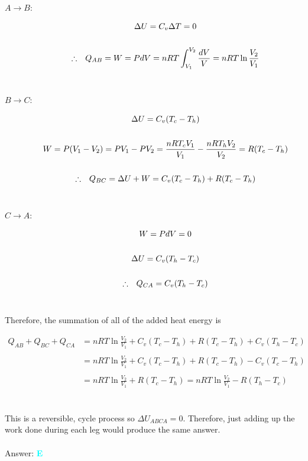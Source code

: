 \documentclass{article}
\begin{document}
\begin{description}
\item[$A \rightarrow B$:] 
\begin{gather}
\Delta U = C_{v} \Delta T = 0\nonumber\\
\nonumber\\
\therefore \hspace{.1in} Q_{AB} = W = PdV =  nRT \int_{V_{1}}^{V_{2}} {\frac{d V}{V}} =  nRT \ln{\frac{V_{2}}{V_{1}}}\nonumber
\end{gather}
\\
\item[$B \rightarrow C$:] 
\begin{gather}
\Delta U = C_{v} (T_{c} - T_{h})\nonumber\\
\nonumber\\
W = P (V_{1} - V_{2}) = P V_{1} - P V_{2} = \frac{nRT_{c} V_{1}}{V_{1}} - \frac{nRT_{h} V_{2}}{V_{2}} = R (T_{c} - T_{h})\nonumber\\
\nonumber\\
\therefore \hspace{.1in} Q_{BC} = \Delta U + W = C_{v} (T_{c} - T_{h}) + R (T_{c} - T_{h})\nonumber
\end{gather}
\\
\item[$C \rightarrow A$:] 
\begin{gather}
W = PdV = 0\nonumber\\
\nonumber\\
\Delta U = C_{v} (T_{h} - T_{c})\nonumber\\
\nonumber\\
\therefore \hspace{.1in} Q_{CA} =  C_{v} (T_{h} - T_{c})\nonumber
\end{gather}
\\
\end{description}
Therefore, the summation of all of the added heat energy is

\begin{align}
Q_{AB} + Q_{BC} + Q_{CA} &= nRT \ln{\frac{V_{2}}{V_{1}}} + C_{v} (T_{c} - T_{h}) + R (T_{c} - T_{h}) + C_{v} (T_{h} - T_{c})\nonumber\\
\nonumber\\
&= nRT \ln{\frac{V_{2}}{V_{1}}} + C_{v} (T_{c} - T_{h}) + R (T_{c} - T_{h}) - C_{v} (T_{c} - T_{h}) \nonumber\\
\nonumber\\
&=nRT \ln{\frac{V_{2}}{V_{1}}} + R (T_{c} - T_{h}) = \boxed{nRT \ln{\frac{V_{2}}{V_{1}}} - R (T_{h} - T_{c})} \nonumber
\end{align}
\\\\
This is a reversible, cycle process so $\Delta U_{ABCA} = 0$. Therefore, just adding up the work done during each leg would produce the same answer.
\\\\
Answer: \textbf{\textcolor{cyan}E}\\
\end{document}
